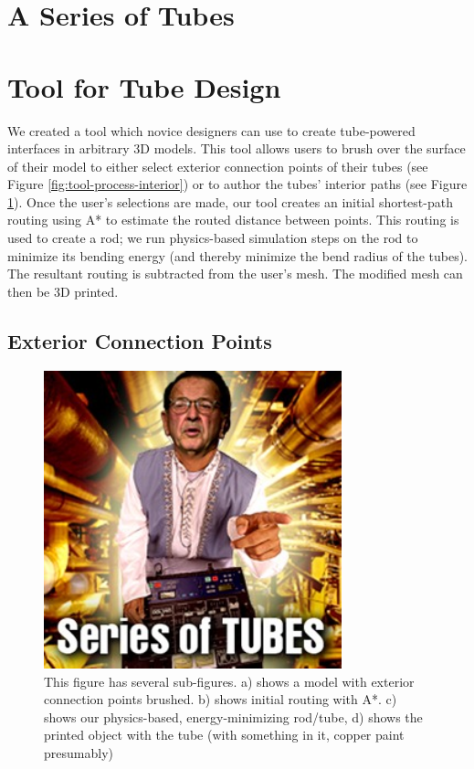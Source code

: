 \section{A Series of Tubes}

\section{Tool for Tube Design}

We created a tool which novice designers can use to create tube-powered interfaces in arbitrary 3D models.  This tool allows users to brush over the surface of their model to either select exterior connection points of their tubes (see Figure \ref{fig:tool-process-interior}) or to author the tubes' interior paths (see Figure \ref{fig:tool-process-exterior}).  Once the user's selections are made, our tool creates an initial shortest-path routing using A* to estimate the routed distance between points.  This routing is used to create a rod; we run physics-based simulation steps on the rod to minimize its bending energy (and thereby minimize the bend radius of the tubes).  The resultant routing is subtracted from the user's mesh.  The modified mesh can then be 3D printed.

\subsection{Exterior Connection Points}

\begin{figure}[h!]
\centering
    \includegraphics[width=3.4in]{figures/series-of-tubes.jpg}
\caption{This figure has several sub-figures.  a) shows a model with exterior connection points brushed.  b) shows initial routing with A*.  c) shows our physics-based, energy-minimizing rod/tube, d) shows the printed object with the tube (with something in it, copper paint presumably)}
\label{fig:tool-process-exterior}
\end{figure}

